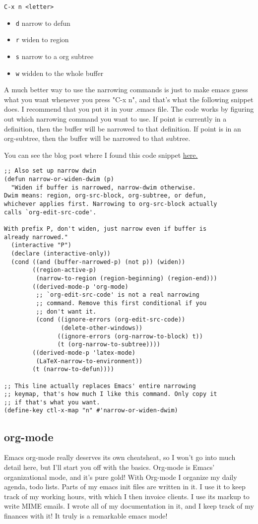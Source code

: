 \documentclass[11pt]{article}
\begin{document}
\texttt{C-x n <letter>}
\begin{itemize}
\item \texttt{d} narrow to defun
\item \texttt{r} widen to region
\item \texttt{s} narrow to a org subtree
\item \texttt{w} widden to the whole buffer
\end{itemize}

A much better way to use the narrowing commands is just to make emacs guess what you want whenever you press "C-x n", and that's what the following snippet does.   I recommend that you put it in your .emacs file.  The code works by figuring out which narrowing command you want to use.  If point is currently in a definition, then the buffer will be narrowed to that definition.  If point is in an org-subtree, then the buffer will be narrowed to that subtree.

You can see the blog post where I found this code snippet \href{http://endlessparentheses.com/emacs-narrow-or-widen-dwim.html}{here.}

\begin{verbatim}
;; Also set up narrow dwin
(defun narrow-or-widen-dwim (p)
  "Widen if buffer is narrowed, narrow-dwim otherwise.
Dwim means: region, org-src-block, org-subtree, or defun,
whichever applies first. Narrowing to org-src-block actually
calls `org-edit-src-code'.

With prefix P, don't widen, just narrow even if buffer is
already narrowed."
  (interactive "P")
  (declare (interactive-only))
  (cond ((and (buffer-narrowed-p) (not p)) (widen))
        ((region-active-p)
         (narrow-to-region (region-beginning) (region-end)))
        ((derived-mode-p 'org-mode)
         ;; `org-edit-src-code' is not a real narrowing
         ;; command. Remove this first conditional if you
         ;; don't want it.
         (cond ((ignore-errors (org-edit-src-code))
                (delete-other-windows))
               ((ignore-errors (org-narrow-to-block) t))
               (t (org-narrow-to-subtree))))
        ((derived-mode-p 'latex-mode)
         (LaTeX-narrow-to-environment))
        (t (narrow-to-defun))))

;; This line actually replaces Emacs' entire narrowing
;; keymap, that's how much I like this command. Only copy it
;; if that's what you want.
(define-key ctl-x-map "n" #'narrow-or-widen-dwim)
\end{verbatim}
\subsection{org-mode}
\label{sec:orgheadline20}
Emacs org-mode really deserves its own cheatsheat, so I won't go into much detail here, but I'll start you off with the basics.  Org-mode is Emacs' organizational mode, and it's pure gold!  With Org-mode I organize my daily agenda, todo lists. Parts of my emacs init files are written in it.  I use it to keep track of my working hours, with which I then invoice clients.  I use its markup to write MIME emails.  I wrote all of my documentation in it, and I keep track of my finances with it!  It truly is a remarkable emacs mode!
\end{document}
